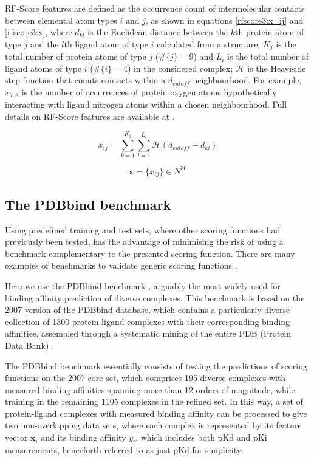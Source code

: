 RF-Score features are defined as the occurrence count of intermolecular contacts between elemental atom types $i$ and $j$, as shown in equations \eqref{rfscore3:x_ij} and \eqref{rfscore3:x}, where $d_{kl}$ is the Euclidean distance between the $k$th protein atom of type $j$ and the $l$th ligand atom of type $i$ calculated from a structure; $K_j$ is the total number of protein atoms of type $j$ ($\#\{j\}=9$) and $L_i$ is the total number of ligand atoms of type $i$ ($\#\{i\}=4$) in the considered complex; $\mathcal{H}$ is the Heaviside step function that counts contacts within a $d_{cutoff}$ neighbourhood. For example, $x_{7,8}$ is the number of occurrences of protein oxygen atoms hypothetically interacting with ligand nitrogen atoms within a chosen neighbourhood. Full details on RF-Score features are available at \citep{564,1295}.

\begin{equation}
\label{rfscore3:x_ij}
x_{ij}=\sum_{k=1}^{K_j}\sum_{l=1}^{L_i}\mathcal{H}(d_{cutoff}-d_{kl})
\end{equation}

\begin{equation}
\label{rfscore3:x}
\mathbf x=\{x_{ij}\}\in N^{36}
\end{equation}

\subsection{The PDBbind benchmark}

Using predefined training and test sets, where other scoring functions had previously been tested, has the advantage of minimising the risk of using a benchmark complementary to the presented scoring function. There are many examples of benchmarks to validate generic scoring functions \citep{1455,1456,571,1457}.

Here we use the PDBbind benchmark \citep{1313}, arguably the most widely used for binding affinity prediction of diverse complexes. This benchmark is based on the 2007 version of the PDBbind database, which contains a particularly diverse collection of 1300 protein-ligand complexes with their corresponding binding affinities, assembled through a systematic mining of the entire PDB (Protein Data Bank) \citep{540,537}.

The PDBbind benchmark essentially consists of testing the predictions of scoring functions on the 2007 core set, which comprises 195 diverse complexes with measured binding affinities spanning more than 12 orders of magnitude, while training in the remaining 1105 complexes in the refined set. In this way, a set of protein-ligand complexes with measured binding affinity can be processed to give two non-overlapping data sets, where each complex is represented by its feature vector $\mathbf x_i$ and its binding affinity $y_i$, which includes both pKd and pKi measurements, henceforth referred to as just pKd for simplicity:

